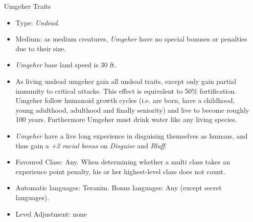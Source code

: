 \begin{35e}{Umgeher Traits}
  \begin{itemize}[noitemsep]
    \item Type: \emph{Undead}.
    \item Medium: as medium creatures, \emph{Umgeher} have no special bonuses or
      penalties due to their size.
    \item \emph{Umgeher} base land speed is 30 ft.
    \item As living undead umgeher gain all undead traits, except only gain
      partial immunity to critical attacks. This effect is equivalent to 50\%
      fortification. Umgeher follow humanoid growth cycles (i.e. are born, have
      a childhood, young adulthood, adulthood and finally seniority) and live to
      become roughly 100 years. Furthermore Umgeher must drink water like any
      living species.
    \item \emph{Umgeher} have a live long experience in disguising themselves as
      humans, and thus gain a \emph{+2 racial bonus} on \emph{Disguise} and
      \emph{Bluff}.
    \item Favoured Class: Any. When determining whether a multi class takes an
      experience point penalty, his or her highest-level class does not count.
    \item Automatic languages: Teranim. Bonus languages: Any (except secret
      languages).
    \item Level Adjustment: none
  \end{itemize}
\end{35e}
